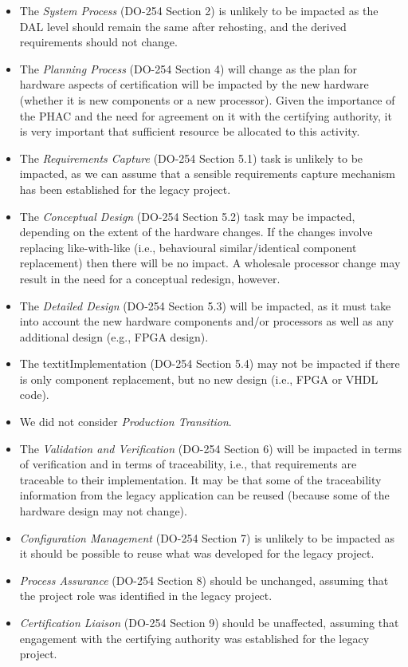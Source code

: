 \documentclass{llncs}
\begin{document}
\begin{itemize}
\item The \textit{System Process} (DO-254 Section 2) is unlikely to be impacted as the DAL level should remain the same after rehosting, and the derived requirements should
not change.

\item The \textit{Planning Process} (DO-254 Section 4) will change as the plan for hardware aspects of certification will be impacted by the new hardware (whether it is new components or a new processor). Given the importance of the PHAC and the need for agreement on it with the certifying authority, it is very important that sufficient resource be allocated to this activity.

\item The \textit{Requirements Capture} (DO-254 Section 5.1) task is unlikely to be impacted, as we can assume that a sensible requirements capture mechanism has been established for the legacy project.

\item The \textit{Conceptual Design} (DO-254 Section 5.2) task may be impacted, depending on the extent of the hardware changes. If the changes involve replacing like-with-like (i.e., behavioural similar/identical component replacement) then there will be no impact. A wholesale processor change may result in the need for a conceptual redesign, however.

\item The \textit{Detailed Design} (DO-254 Section 5.3) will be impacted, as it must take into account the new hardware components and/or processors as well as any additional design (e.g., FPGA design). 

\item The textit{Implementation} (DO-254 Section 5.4) may not be impacted if there is only component replacement, but no new design (i.e., FPGA or VHDL code).

\item We did not consider \textit{Production Transition}.

\item The \textit{Validation and Verification} (DO-254 Section 6) will be impacted in terms of verification and in terms of traceability, i.e., that requirements are traceable to their implementation. It may be that some of the traceability information from the legacy application can be reused (because some of the hardware design may not change).

\item \textit{Configuration Management} (DO-254 Section 7) is unlikely to be impacted as it should be possible to reuse what was developed for the legacy project.

\item \textit{Process Assurance} (DO-254 Section 8) should be unchanged, assuming that the project role was identified in the legacy project.

\item \textit{Certification Liaison} (DO-254 Section 9) should be unaffected, assuming that engagement with the certifying authority was established for the legacy project.
\end{itemize}
\end{document}
